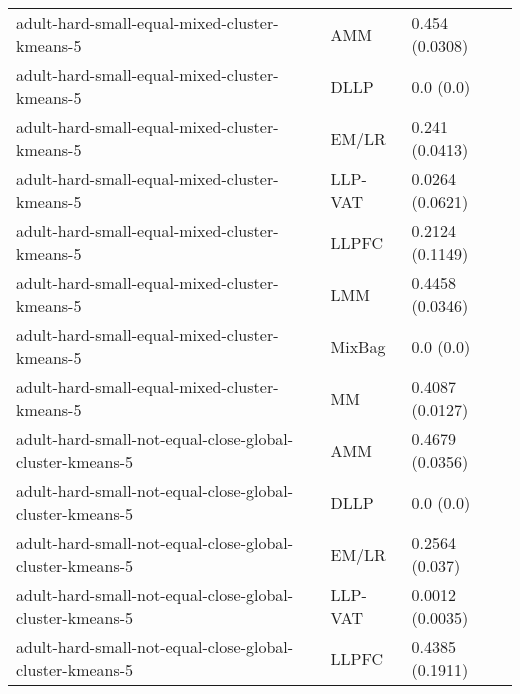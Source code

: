 \begin{longtable}{lll}
                                                                adult-hard-small-equal-mixed-cluster-kmeans-5 &       AMM &                        0.454 (0.0308) \\
                                                                adult-hard-small-equal-mixed-cluster-kmeans-5 &      DLLP &                             0.0 (0.0) \\
                                                                adult-hard-small-equal-mixed-cluster-kmeans-5 &     EM/LR &                        0.241 (0.0413) \\
                                                                adult-hard-small-equal-mixed-cluster-kmeans-5 &   LLP-VAT &                       0.0264 (0.0621) \\
                                                                adult-hard-small-equal-mixed-cluster-kmeans-5 &     LLPFC &                       0.2124 (0.1149) \\
                                                                adult-hard-small-equal-mixed-cluster-kmeans-5 &       LMM &                       0.4458 (0.0346) \\
                                                                adult-hard-small-equal-mixed-cluster-kmeans-5 &    MixBag &                             0.0 (0.0) \\
                                                                adult-hard-small-equal-mixed-cluster-kmeans-5 &        MM &                       0.4087 (0.0127) \\
                                                     adult-hard-small-not-equal-close-global-cluster-kmeans-5 &       AMM &                       0.4679 (0.0356) \\
                                                     adult-hard-small-not-equal-close-global-cluster-kmeans-5 &      DLLP &                             0.0 (0.0) \\
                                                     adult-hard-small-not-equal-close-global-cluster-kmeans-5 &     EM/LR &                        0.2564 (0.037) \\
                                                     adult-hard-small-not-equal-close-global-cluster-kmeans-5 &   LLP-VAT &                       0.0012 (0.0035) \\
                                                     adult-hard-small-not-equal-close-global-cluster-kmeans-5 &     LLPFC &                       0.4385 (0.1911) \\

\end{longtable}
